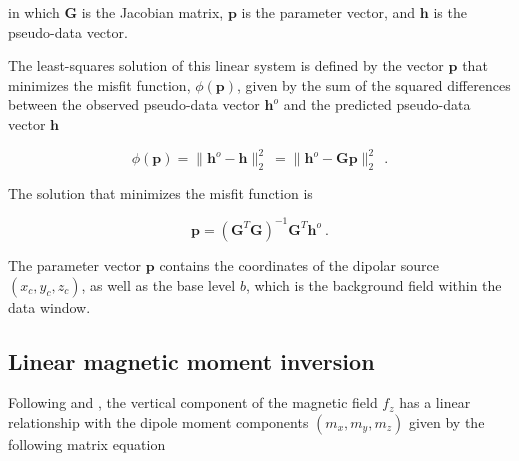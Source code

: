     \noindent
    in which $\mathbf{G}$ is the Jacobian matrix, $\mathbf{p}$ is the parameter vector, and $\mathbf{h}$ is the pseudo-data vector.
    
    The least-squares solution of this linear system is defined by the vector $\mathbf{p}$ that minimizes the misfit function, $\phi(\mathbf{p})$, given by the sum of the squared differences between the observed pseudo-data vector $\mathbf{h}^o$ and the predicted pseudo-data vector $\mathbf{h}$
    
    \begin{equation}
    \label{function_phi}
    \phi(\mathbf{p}) 
    = \| \mathbf{h}^o - \mathbf{h} \|_2^2\ 
    = \| \mathbf{h}^o - \mathbf{G}\mathbf{p} \|_2^2\
    \ .
    \end{equation}
    
    \noindent
    The solution that minimizes the misfit function is
    
    \begin{equation}
    \label{euler_solution}
    \mathbf{p} = \left(\mathbf{G}^T \mathbf{G}\right)^{-1} \mathbf{G}^T \mathbf{h}^o\ .
    \end{equation}

    \noindent
    The parameter vector $\mathbf{p}$ contains the coordinates of the dipolar source $(x_c, y_c, z_c)$, as well as the base level $b$, which is the background field within the data window.
    
\subsection{Linear magnetic moment inversion}
  
     Following \citet{Oliveira2015Estimation} and \citet{Souza-Junior2024}, the vertical component of the magnetic field $f_z$ has a linear relationship with the dipole moment components $(m_x, m_y, m_z)$ given by the following matrix equation

